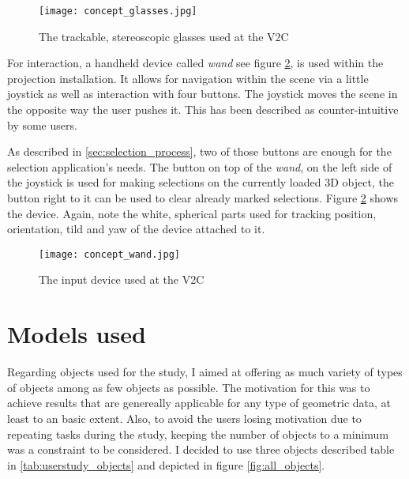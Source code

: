 \begin{figure}[htb]
  \centering
  \texttt{[image: concept\_glasses.jpg]}\\ %
  \caption{The trackable, stereoscopic glasses used at the V2C}\label{fig:glasses}
\end{figure}

For interaction, a handheld device called \textit{wand} see figure \ref{fig:wand}, is used within the projection installation. It allows for navigation within the scene via a little joystick as well as interaction with four buttons. The joystick moves the scene in the opposite way the user pushes it. This has been described as counter-intuitive by some users.

As described in \ref{sec:selection_process}, two of those buttons are enough for the selection application's needs. The button on top of the \textit{wand}, on the left side of the joystick is used for making selections on the currently loaded 3D object, the button  right to it can be used to clear already marked selections. Figure \ref{fig:wand} shows the device. Again, note the white, spherical parts used for tracking position, orientation, tild and yaw of the device attached to it.

\begin{figure}[htb]
  \centering
  \texttt{[image: concept\_wand.jpg]}\\ %
  \caption{The input device used at the V2C}\label{fig:wand}
\end{figure}



\section{Models used}
\label{models_used}
%
%

Regarding objects used for the study, I aimed at offering as much variety of types of objects among as few objects as possible. The motivation for this was to achieve results that are genereally applicable for any type of geometric data, at least to an basic extent. Also, to avoid the users losing motivation due to repeating tasks during the study, keeping the number of objects to a minimum was a constraint to be considered.
I decided to use three objects described table in \ref{tab:userstudy_objects} and depicted in figure \ref{fig:all_objects}.

